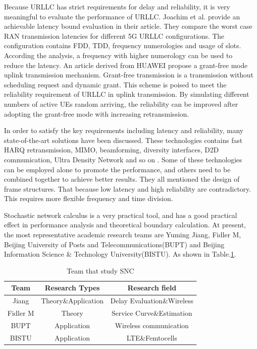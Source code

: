 \documentclass[conference]{IEEEtran}
\begin{document}
Because URLLC has strict requirements for delay and reliability, it is very meaningful to evaluate the performance of URLLC.
Joachim et al. provide an achievable latency bound evaluation in their article\cite{joachim}. They compare the worst case RAN transmission latencies for different 5G URLLC configurations. The configuration contains FDD, TDD, frequency numerologies and usage of slots. According the analysis, a frequency with higher numerology can be used to reduce the latency.
An article derived from HUAWEI propose a grant-free mode uplink transmission mechanism\cite{Huawei}. Grant-free transmission is a transmission without scheduling request and dynamic grant. This scheme is poised to meet the reliability requirement of URLLC in uplink transmission. By simulating different numbers of active UEs random arriving, the reliability can be improved after adopting the grant-free mode with increasing retransmission.

In order to satisfy the key requirements including latency and reliability, many state-of-the-art solutions have been discussed. These technologies contains fast HARQ retransmission, MIMO, beamforming, diversity interfaces, D2D communication, Ultra Density Network and so on \cite{Achieving}\cite{Wireless}\cite{Introduction}\cite{Physical}.
Some of these technologies can be employed alone to promote the performance, and others need to be combined together to achieve better results.
They all mentioned the design of frame structures. That because low latency and high reliability are contradictory. This requires more flexible frequency and time division.

Stochastic network calculus is a very practical tool, and has a good practical effect in performance analysis and theoretical boundary calculation.
At present, the most representative academic research teams are Yuming Jiang, Fidler M, Beijing University of Posts and Telecommunications(BUPT) and Beijing Information Science \& Technology University(BISTU). As shown in Table.\ref{tab_teams}.

\begin{table}[H]
\caption{Team that study SNC}\label{tab_teams}
\center
\begin{tabular}{ccc}
 \toprule
Team     & Research Types    & Research field \\
 \midrule
 Jiang   &Theory\&Application& Delay Evaluation\&Wireless \\
 Fidler M&   Theory          & Service Curve\&Estimation  \\
 BUPT    &   Application     &    Wireless communication  \\
 BISTU   &   Application     &    LTE\&Femtocells \\
 \bottomrule
\end{tabular}
\center
\end{table}
\end{document}
